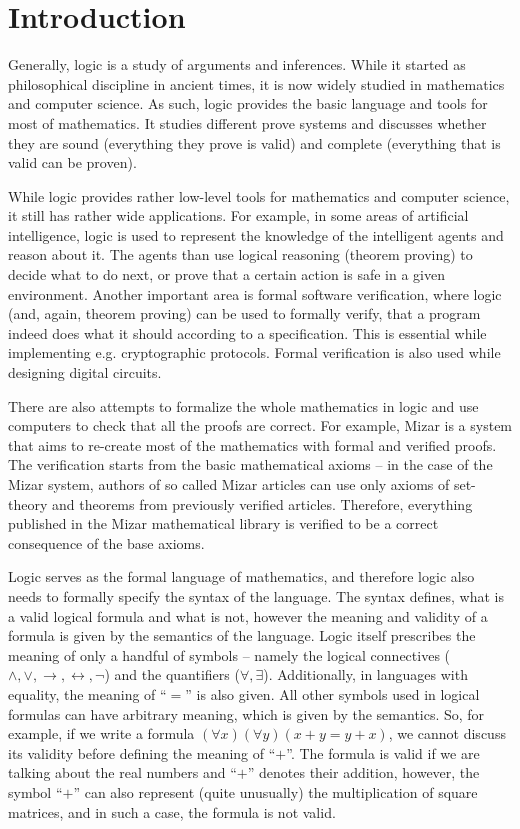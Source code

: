 
\chapter{Introduction}

Generally, logic is a study of arguments and inferences. While it started as philosophical discipline in ancient times, it is now widely studied in mathematics and computer science. As such, logic provides the basic language and tools for most of mathematics. It studies different prove systems and discusses whether they are sound (everything they prove is valid) and complete (everything that is valid can be proven). 

While logic provides rather low-level tools for mathematics and computer science, it still has rather wide applications. For example, in some areas of artificial intelligence, logic is used to represent the knowledge of the intelligent agents and reason about it. The agents than use logical reasoning (theorem proving) to decide what to do next, or prove that a certain action is safe in a given environment. Another important area is formal software verification, where logic (and, again, theorem proving) can be used to formally verify, that a program indeed does what it should according to a specification. This is essential while implementing e.g. cryptographic protocols. Formal verification is also used while designing digital circuits.

There are also attempts to formalize the whole mathematics in logic and use computers to check that all the proofs are correct. For example, Mizar is a system that aims to re-create most of the mathematics with formal and verified proofs. The verification starts from the basic mathematical axioms -- in the case of the Mizar system, authors of so called Mizar articles can use only axioms of set-theory and theorems from previously verified articles. Therefore, everything published in the Mizar mathematical library is verified to be a correct consequence of the base axioms.

Logic serves as the formal language of mathematics, and therefore logic also needs to formally specify the syntax of the language. The syntax defines, what is a valid logical formula and what is not, however the meaning and validity of a formula is given by the semantics of the language. Logic itself prescribes the meaning of only a handful of symbols -- namely the logical connectives ($\land, \lor, \to, \leftrightarrow, \neg$) and the quantifiers ($\forall, \exists $). Additionally, in languages with equality, the meaning of ``$=$'' is also given. All other symbols used in logical formulas can have arbitrary meaning, which is given by the semantics. So, for example, if we write a formula $(\forall x)(\forall y)(x + y = y + x)$, we cannot discuss its validity before defining the meaning of ``$+$''. The formula is valid if we are talking about the real numbers and ``$+$'' denotes their addition, however, the symbol ``$+$'' can also represent (quite unusually) the multiplication of square matrices, and in such a case, the formula is not valid.

